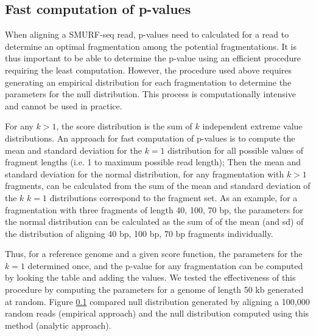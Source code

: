 \subsection{Fast computation of p-values}
When aligning a SMURF-seq read, p-values need to calculated for a read
to determine an optimal fragmentation among the potential
fragmentations. It is thus important to be able to determine the p-value
using an efficient procedure requiring the least computation.
%
However, the procedure used above requires generating an empirical
distribution for each fragmentation to determine the parameters for the
null distribution. This process is computationally intensive and cannot
be used in practice.

For any $k > 1$, the score distribution is the sum of $k$ independent
extreme value distributions. An approach for fast computation of
p-values is to compute the mean and standard deviation for the $k=1$
distribution for all possible values of fragment lengths (i.e. 1 to
maximum possible read length); Then the mean and standard deviation for
the normal distribution, for any fragmentation with $k > 1$ fragments,
can be calculated from the sum of the mean and standard deviation of the
$k$ $k=1$ distributions correspond to the fragment set.
%
As an example, for a fragmentation with three fragments of length 40,
100, 70 bp, the parameters for the normal distribution can be calculated
as the sum of of the mean (and sd) of the distribution of aligning 40
bp, 100 bp, 70 bp fragments individually.

Thus, for a reference genome and a given score function, the parameters for
the $k=1$ determined once, and the p-value for any fragmentation can be
computed by looking the table and adding the values.
%
We tested the effectiveness of this procedure by computing the parameters
for a genome of length 50 kb generated at random. Figure \ref{} compared
null distribution generated by aligning a 100,000 random reads
(empirical approach) and the null distribution computed using this method
(analytic approach).




